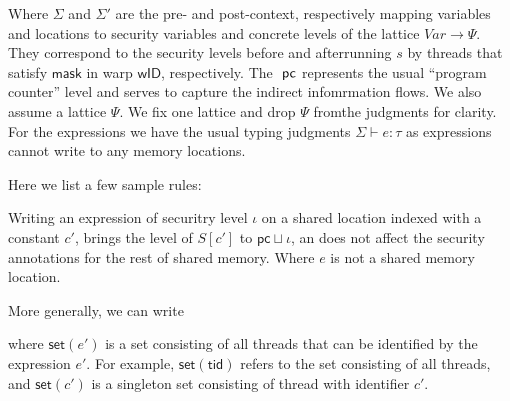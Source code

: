 Where $\Sigma$ and $\Sigma'$ are the pre- and post-context, respectively mapping variables and locations to security variables and concrete levels of the lattice $\mathit{Var} \rightarrow \Psi$.
%
They correspond to the  security levels before  and afterrunning $s$ by threads that satisfy $\mathsf{mask}$ in warp $\mathsf{wID}$, respectively.
%
%
The $\pc$ represents the usual ``program counter'' level and serves to capture the indirect infomrmation flows.
% 
We also assume a lattice $\Psi$.
%
We fix one lattice and drop $\Psi$ fromthe judgments for clarity.
%
%
For the expressions we have the usual typing judgments $\Sigma \vdash e: \tau$ as expressions cannot write to any memory locations.
%
%

%
Here we list a few sample rules:

Writing an expression of securitry level $\iota$ on a shared location indexed with a constant $c'$, brings the level of $S[c']$ to $\mathsf{pc}\sqcup \iota$, an does not affect the security annotations for the rest of shared memory.
%
Where $e$ is not a shared memory location.
\begin{mathpar}
\end{mathpar}


\begin{mathpar}
    \end{mathpar}

More generally, we can write

\begin{mathpar}
    \end{mathpar}
where $\mathsf{set}(e')$ is a set consisting of all threads that can be identified by the expression $e'$. For example, $\mathsf{set}(\mathsf{tid})$ refers to the set consisting of all threads, and $\mathsf{set}(c')$ is a singleton set consisting of thread with identifier $c'$.

